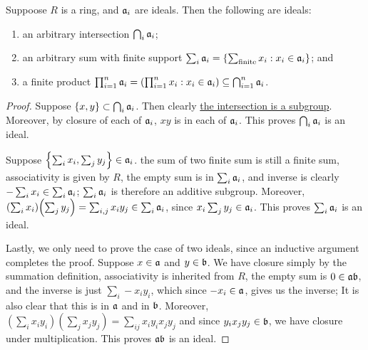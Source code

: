 \begin{proposition}\label{prop:ideal-operations}
    Suppoose \(R\) is a ring,
    and \(\mathfrak{a}_i\) are ideals.
    Then the following are ideals:
    \begin{enumerate}[label={(\alph*)}, itemsep=0mm]
        \item an arbitrary intersection \(\bigcap_i \mathfrak{a}_i\);
        \item an arbitrary sum with finite support \(\sum_i \mathfrak{a}_i = \{\sum_\text{finite} x_i : x_i \in \mathfrak{a}_i\}\); and
        \item a finite product \(\prod_{i=1}^n \mfk{a}_i = \pqty{\prod_{i=1}^n x_i : x_i \in \mfk{a}_i} \subseteq \bigcap_{i=1}^n \mfk{a}_i\).
    \end{enumerate}
\end{proposition}
\begin{proof}
    Suppose \(\{x,y\} \subset \bigcap_i \mathfrak{a}_i\). Then clearly
    \hyperref[lem:intersection-subgroup]{the intersection is a subgroup}.
    Moreover, by closure of each of \(\mathfrak{a}_i\),
    \(xy\) is in each of \(\mathfrak{a}_i\).
    This proves \(\bigcap_i \mathfrak{a}_i\) is an ideal.

    Suppose \(\Bqty{\sum_i x_i, \sum_j y_j} \in \mfk{a}_i\).
    the sum of two finite sum is still a finite sum,
    associativity is given by \(R\),
    the empty sum is in \(\sum_i \mathfrak{a}_i\),
    and inverse is clearly \(-\sum_i x_i \in \sum_i \mathfrak{a}_i\);
    \(\sum_i \mathfrak{a}_i\) is therefore an additive subgroup.
    Moreover, \(\pqty{\sum_i x_i}\pqty{\sum_j y_j} = \sum_{i,j} x_i y_j \in \sum_i \mfk{a}_i\),
    since \(x_i \sum_j y_j \in \mathfrak{a}_i\).
    This proves \(\sum_i \mathfrak{a}_i\) is an ideal.

    Lastly, we only need to prove the case of two ideals,
    since an inductive argument completes the proof.
    Suppose \(x \in \mathfrak{a}\) and \(y \in \mathfrak{b}\).
    We have closure simply by the summation definition,
    associativity is inherited from \(R\),
    the empty sum is \(0 \in \mathfrak{ab}\),
    and the inverse is just \(\sum_i -x_i y_i\),
    which since \(-x_i \in \mathfrak{a}\), gives us the inverse;
    It is also clear that this is in \(\mathfrak{a}\) and in \(\mathfrak{b}\).
    Moreover, \((\sum_i x_i y_i)(\sum_j x_j y_j)
    = \sum_{ij} x_i y_i x_j y_j\)
    and since \(y_i x_j y_j \in \mathfrak{b}\),
    we have closure under multiplication.
    This proves \(\mathfrak{ab}\) is an ideal.
\end{proof}
